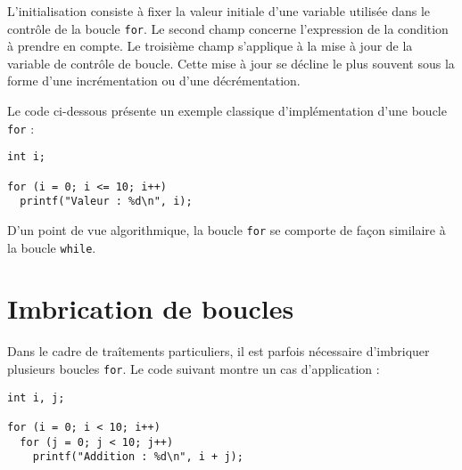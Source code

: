 \documentclass[DIV=calc,paper=a4,fontsize=11pt,twocolumn,halfparskip,parindent]{scrartcl} %
\begin{document}
L'initialisation consiste à fixer la valeur initiale d'une variable utilisée dans le contrôle de la boucle \texttt{for}. Le second champ concerne l'expression de la condition
à prendre en compte. Le troisième champ s'applique à la mise à jour de la variable de contrôle de boucle. Cette mise à jour se décline le plus souvent sous la forme d'une
incrémentation ou d'une décrémentation.

Le code ci-dessous présente un exemple classique d'implémentation d'une boucle \texttt{for} :
\begin{lstlisting}[frame=single]
int i;
  
for (i = 0; i <= 10; i++)
  printf("Valeur : %d\n", i);  
\end{lstlisting}

D'un point de vue algorithmique, la boucle \texttt{for} se comporte de façon similaire à la boucle \texttt{while}.

\section*{Imbrication de boucles}
Dans le cadre de traîtements particuliers, il est parfois nécessaire d'imbriquer plusieurs boucles \texttt{for}. Le code suivant montre un cas d'application :
\begin{lstlisting}[frame=single]
int i, j;
  
for (i = 0; i < 10; i++)
  for (j = 0; j < 10; j++)
    printf("Addition : %d\n", i + j);  
\end{lstlisting}
\end{document}
